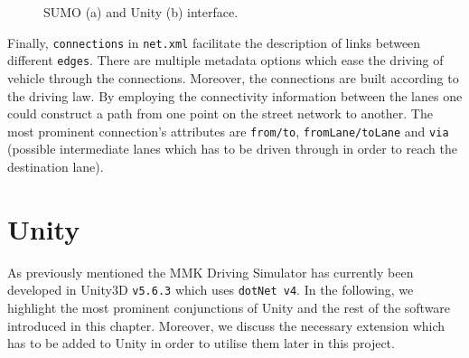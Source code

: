 \begin{figure}[htb]
	\centering
	\caption{SUMO (a) and Unity (b) interface.}
\end{figure}

Finally, \texttt{connections} in \texttt{net.xml} facilitate the description of links between different \texttt{edges}. There are multiple metadata options which ease the driving of vehicle through the connections. Moreover, the connections are built according to the driving law. By employing the connectivity information between the lanes one could construct a path from one point on the street network to another. The most prominent connection's attributes are \texttt{from/to}, \texttt{fromLane/toLane} and \texttt{via} (possible intermediate lanes which has to be driven through in order to reach the destination lane). 

\section{Unity}
\label{ch:unity}
As previously mentioned the MMK Driving Simulator has currently been developed  in Unity3D \texttt{v5.6.3} which uses \texttt{dotNet v4}. In the following, we highlight the most prominent conjunctions of Unity and the rest of the software introduced in this chapter. Moreover, we discuss the necessary extension which has to be added to Unity in order to utilise them later in this project.

